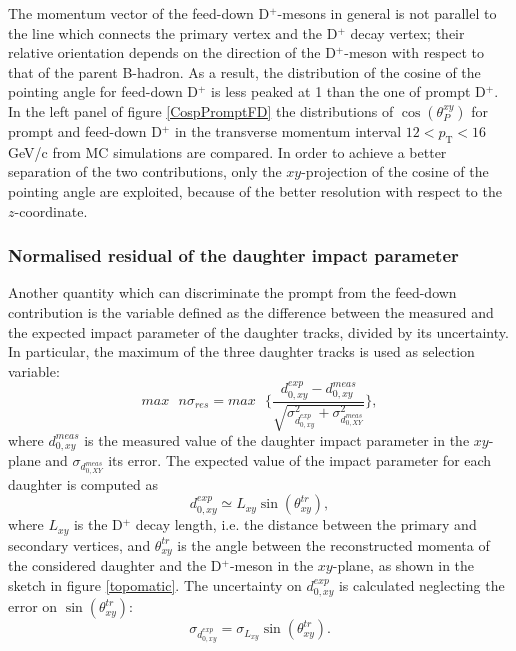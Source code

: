 \documentclass[b5paper,10pt,twoside,oldstyle,classica]{toptesi}
\newcommand{\pt}{p_\text{T}}
\begin{document}
The momentum vector of the feed-down D$^+$-mesons in general is not parallel to the line which connects the primary vertex and the D$^+$ decay vertex; their relative orientation depends on the direction of the D$^+$-meson with respect to that of the parent B-hadron. As a result, the distribution of the cosine of the pointing angle for feed-down D$^+$ is less peaked at 1 than the one of prompt D$^+$. In the left panel of figure \ref{CospPromptFD} the distributions of $\cos(\theta_P^{xy})$ for prompt and feed-down D$^+$ in the transverse momentum interval $12<\pt<16$ GeV/c from MC simulations are compared. In order to achieve a better separation of the two contributions, only the $xy$-projection of the cosine of the pointing angle are exploited, because of the better resolution with respect to the $z$-coordinate.   
\subsubsection{Normalised residual of the daughter impact parameter}
\label{topomatic_sec}
Another quantity which can discriminate the prompt from the feed-down contribution is the variable defined as the difference between the measured and the expected impact parameter of the daughter tracks, divided by its uncertainty. In particular, the maximum of the three daughter tracks is used as selection variable: 
\begin{equation}
 max\text{ }n\sigma_{res} = max\text{ }\bigg\{ \frac{d_{0,xy}^{exp}-d_{0,xy}^{meas}}{\sqrt{\sigma_{d_{0,xy}^{exp}}^2+\sigma_{d_{0,XY}^{meas}}^2}}\bigg\},
\end{equation}
where $d_{0,xy}^{meas}$ is the measured value of the daughter impact parameter in the $xy$-plane and $\sigma_{d_{0,XY}^{meas}}$ its error.
The expected value of the impact parameter for each daughter is computed as
\begin{equation}
 d_{0,xy}^{exp} \simeq L_{xy}\sin({\theta_{xy}^{tr}}),
\end{equation}
where $L_{xy}$ is the D$^+$ decay length, i.e. the distance between the primary and secondary vertices, and $\theta_{xy}^{tr}$ is the angle between the reconstructed momenta of the considered daughter and the D$^+$-meson in the $xy$-plane, as shown in the sketch in figure \ref{topomatic}. The uncertainty on $d_{0,xy}^{exp}$ is calculated neglecting the error on $\sin({\theta_{xy}^{tr}})$:
\begin{equation}
 \sigma_{d_{0,xy}^{exp}} = \sigma_{L_{xy}}\sin({\theta_{xy}^{tr}}).
\end{equation}
\end{document}
